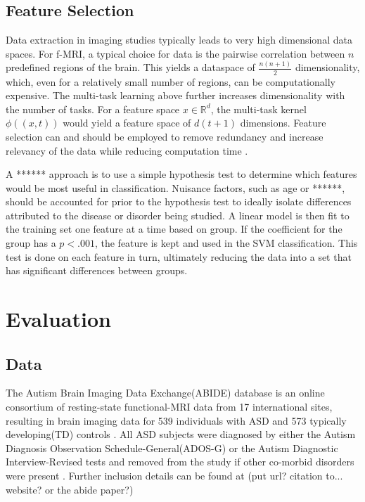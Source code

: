 \documentclass{llncs}
\begin{document}
\subsection{Feature Selection}
\label{subsec:FS}
Data extraction in imaging studies typically leads to very high dimensional data spaces.  For f-MRI, a typical choice for data is the pairwise correlation between $n$ predefined regions of the brain.  This yields a dataspace of $\frac{n(n+1)}{2}$ dimensionality, which, even for a relatively small number of regions, can be  computationally expensive.  The multi-task learning above further increases dimensionality with the number of tasks. For a feature space $x \in \mathbb{R}^d$, the multi-task kernel $\phi((x,t))$ would yield a feature space of $d(t+1)$ dimensions.  Feature selection can and should be employed to remove redundancy and increase relevancy of the data while reducing computation time \cite{featsel}.

A ****** approach is to use a simple hypothesis test to determine which features would be most useful in classification.  Nuisance factors, such as age or ******, should be accounted for prior to the hypothesis test to ideally isolate differences attributed to the disease or disorder being studied.  A linear model is then fit to the training set one feature at a time based on group.  If the coefficient for the group  has a $p < .001$, the feature is kept and used in the SVM classification. This test is done on each feature in turn, ultimately reducing the data into a set that has significant differences between groups.
\section{Evaluation}
\subsection{Data}
The Autism Brain Imaging Data Exchange(ABIDE) database is an online consortium of resting-state functional-MRI data from 17 international sites, resulting in brain imaging data for 539 individuals with ASD and 573 typically developing(TD)  controls \cite{abide}. All ASD subjects were diagnosed by either the Autism Diagnosis Observation Schedule-General(ADOS-G) or the Autism Diagnostic Interview-Revised tests and removed from the study if other co-morbid disorders were present \cite{lordADOS} \cite{lordADIR} \cite{abide}.  Further inclusion details can be found at (put url? citation to... website? or the abide paper?)
\end{document}
